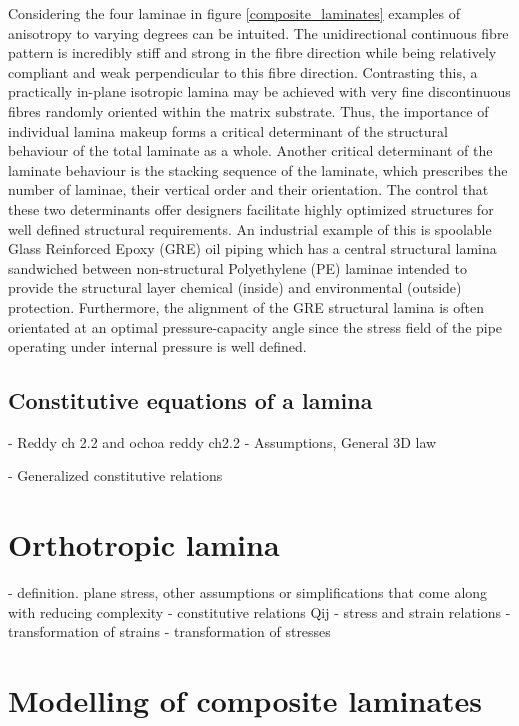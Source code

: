 Considering the four laminae in figure \ref{composite_laminates} examples of anisotropy to varying degrees can be intuited. The unidirectional continuous fibre pattern is incredibly stiff and strong in the fibre direction while being relatively compliant and weak  perpendicular to this fibre direction. Contrasting this, a practically in-plane isotropic lamina may be achieved with very fine discontinuous fibres randomly oriented within the matrix substrate. Thus, the importance of individual lamina makeup forms a critical determinant of the structural behaviour of the total laminate as a whole. Another critical determinant of the laminate behaviour is the stacking sequence of the laminate, which prescribes the number of laminae, their vertical order and their orientation. The control that these two determinants offer designers facilitate highly optimized structures for well defined structural requirements. An industrial example of this is spoolable Glass Reinforced Epoxy (GRE) oil piping which has a central structural lamina sandwiched between non-structural Polyethylene (PE) laminae intended to provide the structural layer chemical (inside) and environmental (outside) protection. Furthermore, the alignment of the GRE structural lamina is often orientated at an optimal pressure-capacity angle since the stress field of the pipe operating under internal pressure is well defined.

\subsection{Constitutive equations of a lamina}

 - Reddy ch 2.2 and ochoa reddy ch2.2 \cite{OchoaReddy92}
- Assumptions, General 3D law


- Generalized constitutive relations

\section{Orthotropic lamina}

- definition. plane stress, other assumptions or simplifications that come along with reducing complexity
-  constitutive relations Qij - stress and strain relations
	- transformation of strains
	- transformation of stresses

\section{Modelling of composite laminates}

